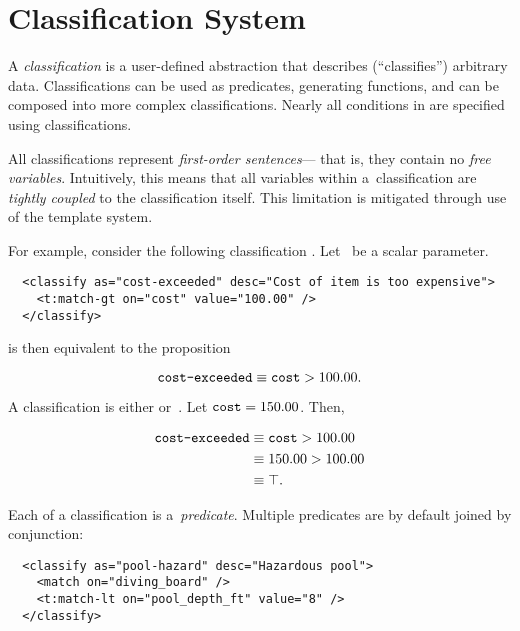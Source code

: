 
\section{Classification System}
A \emph{classification} is a user-defined abstraction that describes
  (``classifies'') arbitrary data.
Classifications can be used as predicates, generating functions, and can be
  composed into more complex classifications.
Nearly all conditions in \tame{} are specified using classifications.

All classifications represent \emph{first-order sentences}---%
  that is,
    they contain no \emph{free variables}.
Intuitively,
  this means that all variables within a~classification are
  \emph{tightly coupled} to the classification itself.
This limitation is mitigated through use of the template system.

For example,
  consider the following classification .
Let~ be a scalar parameter.

\begin{lstlisting}
  <classify as="cost-exceeded" desc="Cost of item is too expensive">
    <t:match-gt on="cost" value="100.00" />
  </classify>
\end{lstlisting}

\noindent
is then equivalent to the proposition

\begin{equation*}
  \texttt{cost-exceeded} \equiv \texttt{cost} > 100.00.
\end{equation*}

A classification is either \true or~\false.
Let $\texttt{cost}=150.00$.
Then,

\begin{align*}
  \texttt{cost-exceeded} & \equiv \texttt{cost} > 100.00 \\
                            & \equiv 150.00 > 100.00 \\
                            & \equiv \top.
\end{align*}

Each  of a classification is a~\emph{predicate}.
Multiple predicates are by default joined by conjunction:

\begin{lstlisting}
  <classify as="pool-hazard" desc="Hazardous pool">
    <match on="diving_board" />
    <t:match-lt on="pool_depth_ft" value="8" />
  </classify>
\end{lstlisting}

